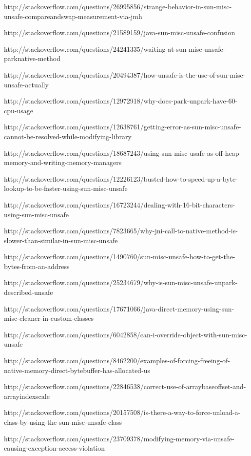 http://stackoverflow.com/questions/26995856/strange-behavior-in-sun-misc-unsafe-compareandswap-measurement-via-jmh

http://stackoverflow.com/questions/21589159/java-sun-misc-unsafe-confusion

http://stackoverflow.com/questions/24241335/waiting-at-sun-misc-unsafe-parknative-method

http://stackoverflow.com/questions/20494387/how-unsafe-is-the-use-of-sun-misc-unsafe-actually

http://stackoverflow.com/questions/12972918/why-does-park-unpark-have-60-cpu-usage

http://stackoverflow.com/questions/12638761/getting-error-as-sun-misc-unsafe-cannot-be-resolved-while-modifying-library

http://stackoverflow.com/questions/18687243/using-sun-misc-usafe-as-off-heap-memory-and-writing-memory-managers

http://stackoverflow.com/questions/12226123/busted-how-to-speed-up-a-byte-lookup-to-be-faster-using-sun-misc-unsafe

http://stackoverflow.com/questions/16723244/dealing-with-16-bit-characters-using-sun-misc-unsafe

http://stackoverflow.com/questions/7823665/why-jni-call-to-native-method-is-slower-than-similar-in-sun-misc-unsafe

http://stackoverflow.com/questions/1490760/sun-misc-unsafe-how-to-get-the-bytes-from-an-address

http://stackoverflow.com/questions/25234679/why-is-sun-misc-unsafe-unpark-described-unsafe

http://stackoverflow.com/questions/17671066/java-direct-memory-using-sun-misc-cleaner-in-custom-classes

http://stackoverflow.com/questions/6042858/can-i-override-object-with-sun-misc-unsafe

http://stackoverflow.com/questions/8462200/examples-of-forcing-freeing-of-native-memory-direct-bytebuffer-has-allocated-us

http://stackoverflow.com/questions/22846538/correct-use-of-arraybaseoffset-and-arrayindexscale

http://stackoverflow.com/questions/20157508/is-there-a-way-to-force-unload-a-class-by-using-the-sun-misc-unsafe-class

http://stackoverflow.com/questions/23709378/modifying-memory-via-unsafe-causing-exception-access-violation




